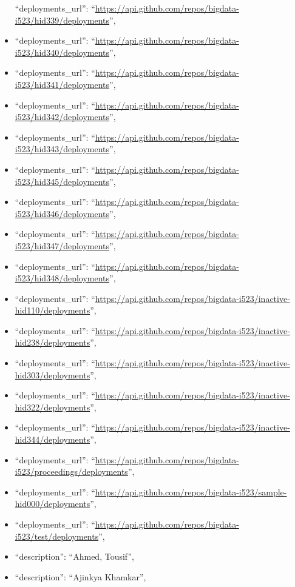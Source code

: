 \begin{itemize}
  ``deployments\_url'':
  ``\url{https://api.github.com/repos/bigdata-i523/hid339/deployments}'',
\item
  ``deployments\_url'':
  ``\url{https://api.github.com/repos/bigdata-i523/hid340/deployments}'',
\item
  ``deployments\_url'':
  ``\url{https://api.github.com/repos/bigdata-i523/hid341/deployments}'',
\item
  ``deployments\_url'':
  ``\url{https://api.github.com/repos/bigdata-i523/hid342/deployments}'',
\item
  ``deployments\_url'':
  ``\url{https://api.github.com/repos/bigdata-i523/hid343/deployments}'',
\item
  ``deployments\_url'':
  ``\url{https://api.github.com/repos/bigdata-i523/hid345/deployments}'',
\item
  ``deployments\_url'':
  ``\url{https://api.github.com/repos/bigdata-i523/hid346/deployments}'',
\item
  ``deployments\_url'':
  ``\url{https://api.github.com/repos/bigdata-i523/hid347/deployments}'',
\item
  ``deployments\_url'':
  ``\url{https://api.github.com/repos/bigdata-i523/hid348/deployments}'',
\item
  ``deployments\_url'':
  ``\url{https://api.github.com/repos/bigdata-i523/inactive-hid110/deployments}'',
\item
  ``deployments\_url'':
  ``\url{https://api.github.com/repos/bigdata-i523/inactive-hid238/deployments}'',
\item
  ``deployments\_url'':
  ``\url{https://api.github.com/repos/bigdata-i523/inactive-hid303/deployments}'',
\item
  ``deployments\_url'':
  ``\url{https://api.github.com/repos/bigdata-i523/inactive-hid322/deployments}'',
\item
  ``deployments\_url'':
  ``\url{https://api.github.com/repos/bigdata-i523/inactive-hid344/deployments}'',
\item
  ``deployments\_url'':
  ``\url{https://api.github.com/repos/bigdata-i523/proceedings/deployments}'',
\item
  ``deployments\_url'':
  ``\url{https://api.github.com/repos/bigdata-i523/sample-hid000/deployments}'',
\item
  ``deployments\_url'':
  ``\url{https://api.github.com/repos/bigdata-i523/test/deployments}'',
\item
  ``description'': ``Ahmed, Tousif'',
\item
  ``description'': ``Ajinkya Khamkar'',

\end{itemize}
